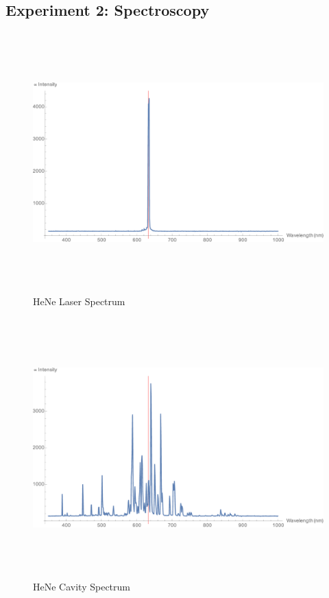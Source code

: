 \documentclass[a4paper]{scrartcl}
\begin{document}
\subsection{Experiment 2: Spectroscopy}
\begin{figure}
    \centering
    \includegraphics[height = 10cm]{Q2/HeNe Laser.png}
    \caption{HeNe Laser Spectrum}
    \label{fig:hene-laser}
\end{figure}
\begin{figure}
    \centering
    \includegraphics[height = 10cm]{Q2/HeNe Cavity.png}
    \caption{HeNe Cavity Spectrum}
    \label{fig:hene-cavity}
\end{figure}
\end{document}
